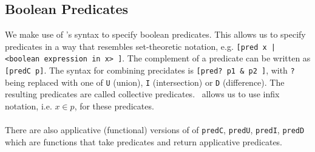 \subsection{Boolean Predicates}
We make use of \ssreflect's syntax to specify boolean predicates.
This allows us to specify predicates in a way that resembles set-theoretic notation, e.g. 
\lstinline{[pred x | <boolean expression in x> ]}. 
The complement of a predicate can be written as \lstinline{[predC p]}.
The syntax for combining precidates is \lstinline{[pred? p1 & p2 ]}, with \lstinline{?} being replaced with one of 
\lstinline{U} (union), \lstinline{I} (intersection) or \lstinline{D} (difference).
The resulting predicates are called collective predicates. 
\ssreflect\ allows us to use infix notation, i.e. $x \in p$, for these predicates.

\paragraph{}
There are also applicative (functional) versions of of \lstinline{predC}, \lstinline{predU}, \lstinline{predI}, \lstinline{predD} which are functions that take predicates and return applicative predicates.

